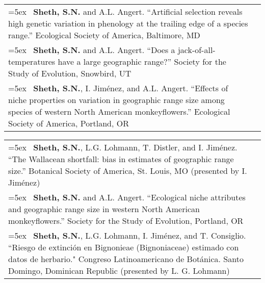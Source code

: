 \documentclass[11pt,english]{article}\usepackage[]{graphicx}\usepackage[]{color}
\providecommand{\tabularnewline}{\\}
\begin{document}
\renewcommand{\arraystretch}{1.2} 
\begin{tabularx}{\textwidth}{@{}>{\raggedright}p{5.25in} >{\raggedleft}X@{}}

\hangindent=5ex \ \textbf{Sheth, S.N.} and A.L. Angert. ``Artificial selection reveals high genetic variation in phenology at the trailing edge of a species range.'' Ecological Society of America, Baltimore, MD & 2015 \tabularnewline

\hangindent=5ex \ \textbf{Sheth, S.N.} and A.L. Angert. ``Does a jack-of-all-temperatures have a large geographic range?'' Society for the Study of Evolution, Snowbird, UT & 2013 \tabularnewline

\hangindent=5ex \ \textbf{Sheth, S.N.}, I. Jim\'enez, and A.L. Angert. ``Effects of niche properties on variation in geographic range size among species of western North American monkeyflowers.'' Ecological Society of America, Portland, OR & 2012 \tabularnewline

\end{tabularx}

\renewcommand{\arraystretch}{1.2} 
\begin{tabularx}{\textwidth}{@{}>{\raggedright}p{5.25in} >{\raggedleft}X@{}}

\hangindent=5ex \ \textbf{Sheth, S.N.}, L.G. Lohmann, T. Distler, and I. Jim\'enez. ``The Wallacean shortfall: bias in estimates of geographic range size.'' Botanical Society of America, St. Louis, MO (presented by I. Jim\'enez) & 2011 \tabularnewline

\hangindent=5ex \ \textbf{Sheth, S.N.} and A.L. Angert. ``Ecological niche attributes and geographic range size in western North American monkeyflowers.'' Society for the Study of Evolution, Portland, OR & 2010 \tabularnewline

\hangindent=5ex \ \textbf{Sheth, S.N.}, L.G. Lohmann, I. Jim\'enez, and T. Consiglio. ``Riesgo de extinci\'on en Bignonieae (Bignoniaceae) estimado con datos de herbario." Congreso Latinoamericano de Bot\'anica. Santo Domingo, Dominican Republic (presented by L. G. Lohmann) & 2006 \tabularnewline 

\end{tabularx}

\end{document}
